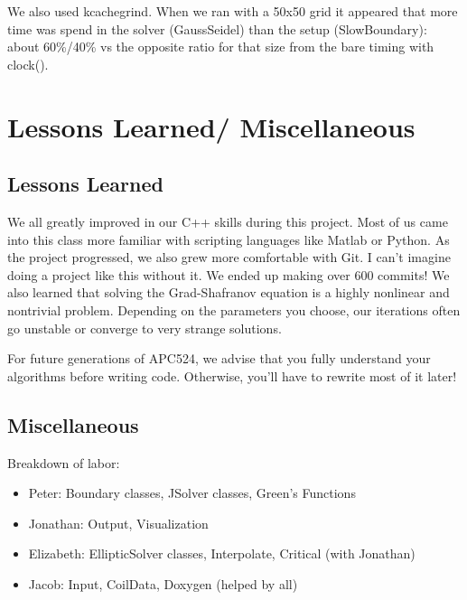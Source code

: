\documentclass[paper=letter, fontsize=11pt]{scrartcl} %
\begin{document}
We also used kcachegrind. When we ran with a 50x50 grid it appeared that more time was spend in the solver (GaussSeidel) than the setup (SlowBoundary): about 60\%/40\% vs the opposite ratio for that size from the bare timing with clock(). 


\section{Lessons Learned/ Miscellaneous}
\subsection{Lessons Learned}

We all greatly improved in our C++ skills during this project.  Most of us came into this class more familiar with scripting languages like Matlab or Python.  As the project progressed, we also grew more comfortable with Git.  I can't imagine doing a project like this without it.  We ended up making over 600 commits!  We also learned that solving the Grad-Shafranov equation is a highly nonlinear and nontrivial problem.  Depending on the parameters you choose, our iterations often go unstable or converge to very strange solutions.  

For future generations of APC524, we advise that you fully understand your algorithms before writing code.  Otherwise, you'll have to rewrite most of it later!  

\subsection{Miscellaneous}
Breakdown of labor:

\begin{itemize}
\item Peter: Boundary classes, JSolver classes, Green's Functions
\item Jonathan: Output, Visualization 
\item Elizabeth: EllipticSolver classes, Interpolate, Critical (with Jonathan)
\item Jacob: Input, CoilData, Doxygen (helped by all)
\end{itemize}
\end{document}

